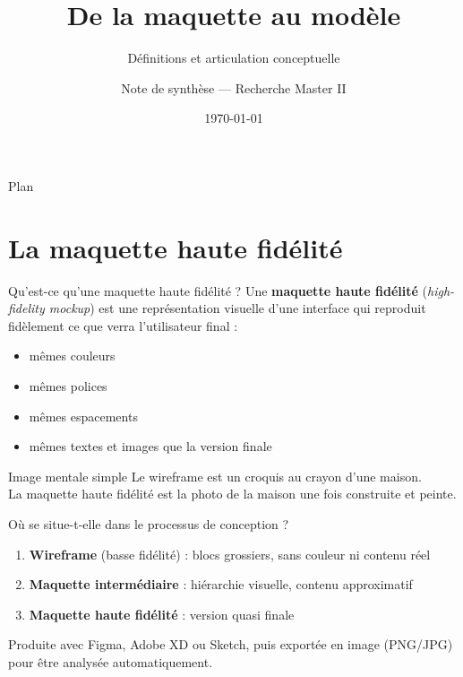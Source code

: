 \documentclass[11pt,aspectratio=169]{beamer}
\title[Maquette $\to$ Modèle]{De la maquette au modèle}
\subtitle{Définitions et articulation conceptuelle}
\author{Note de synthèse --- Recherche Master II}
\date{\today}
\begin{document}
\begin{frame}
\titlepage
\end{frame}

\begin{frame}{Plan}
\tableofcontents
\end{frame}

\section{La maquette haute fidélité}

\begin{frame}{Qu'est-ce qu'une maquette haute fidélité ?}
Une \textbf{maquette haute fidélité} (\emph{high-fidelity mockup}) est une représentation visuelle d'une interface qui reproduit fidèlement ce que verra l'utilisateur final :
\begin{itemize}
    \item mêmes couleurs
    \item mêmes polices
    \item mêmes espacements
    \item mêmes textes et images que la version finale
\end{itemize}

\vspace{0.3cm}
\begin{block}{Image mentale simple}
Le wireframe est un croquis au crayon d'une maison.\\
La maquette haute fidélité est la photo de la maison une fois construite et peinte.
\end{block}
\end{frame}

\begin{frame}{Où se situe-t-elle dans le processus de conception ?}
\begin{enumerate}
    \item \textbf{Wireframe} (basse fidélité) : blocs grossiers, sans couleur ni contenu réel
    \item \textbf{Maquette intermédiaire} : hiérarchie visuelle, contenu approximatif
    \item \textbf{Maquette haute fidélité} : version quasi finale
\end{enumerate}

\vspace{0.4cm}
Produite avec Figma, Adobe XD ou Sketch, puis exportée en image (PNG/JPG) pour être analysée automatiquement.
\end{frame}
\end{document}
